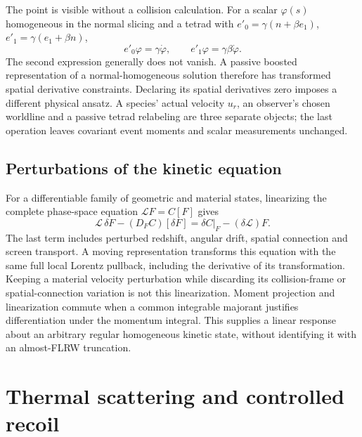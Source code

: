 The point is visible without a collision calculation. For a scalar $\varphi(s)$ homogeneous in the normal slicing and a tetrad with
$e'_0=\gamma(n+\beta e_1)$, $e'_1=\gamma(e_1+\beta n)$,
\begin{equation}
 e'_0\varphi=\gamma\dot\varphi,\qquad
 e'_1\varphi=\gamma\beta\dot\varphi.
 \label{ii:tilted_homogeneity}
\end{equation}
The second expression generally does not vanish. A passive boosted representation of a normal-homogeneous solution therefore has transformed spatial derivative constraints. Declaring its spatial derivatives zero imposes a different physical ansatz. A species' actual velocity $u_r$, an observer's chosen worldline and a passive tetrad relabeling are three separate objects; the last operation leaves covariant event moments and scalar measurements unchanged.


\subsection{Perturbations of the kinetic equation}
For a differentiable family of geometric and material states, linearizing the complete phase-space equation $\mathscr LF=C[F]$ gives
\begin{equation}
 \mathscr L\,\delta F-(D_FC)[\delta F]
 =\delta C\big|_{F}-(\delta\mathscr L)F.
 \label{ii:kinetic_linearization}
\end{equation}
The last term includes perturbed redshift, angular drift, spatial connection and screen transport. A moving representation transforms this equation with the same full local Lorentz pullback, including the derivative of its transformation. Keeping a material velocity perturbation while discarding its collision-frame or spatial-connection variation is not this linearization. Moment projection and linearization commute when a common integrable majorant justifies differentiation under the momentum integral. This supplies a linear response about an arbitrary regular homogeneous kinetic state, without identifying it with an almost-FLRW truncation.

\section{Thermal scattering and controlled recoil}

